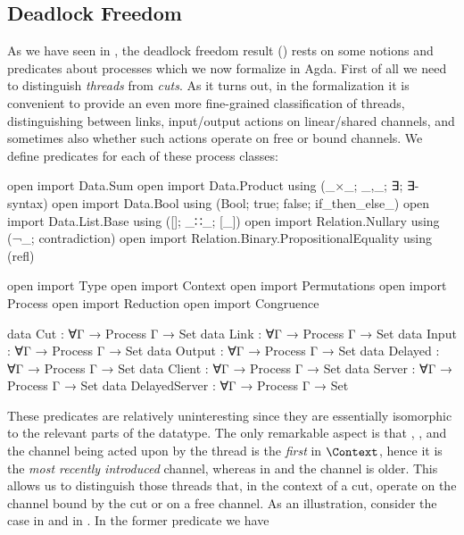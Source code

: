 \subsection{Deadlock Freedom}
\label{sec:deadlock-freedom-agda}

As we have seen in , the deadlock freedom result
() rests on some notions and predicates about processes which we
now formalize in Agda. First of all we need to distinguish \emph{threads} from
\emph{cuts}. As it turns out, in the formalization it is convenient to provide
an even more fine-grained classification of threads, distinguishing between
links, input/output actions on linear/shared channels, and sometimes also
whether such actions operate on free or bound channels. We define predicates for
each of these process classes:

\begin{code}[hide]
open import Data.Sum
open import Data.Product using (_×_; _,_; ∃; ∃-syntax)
open import Data.Bool using (Bool; true; false; if_then_else_)
open import Data.List.Base using ([]; _∷_; [_])
open import Relation.Nullary using (¬_; contradiction)
open import Relation.Binary.PropositionalEquality using (refl)

open import Type
open import Context
open import Permutations
open import Process
open import Reduction
open import Congruence
\end{code}

\begin{code}
data Cut            : ∀{Γ} → Process Γ → Set
data Link           : ∀{Γ} → Process Γ → Set
data Input          : ∀{Γ} → Process Γ → Set
data Output         : ∀{Γ} → Process Γ → Set
data Delayed        : ∀{Γ} → Process Γ → Set
data Client         : ∀{Γ} → Process Γ → Set
data Server         : ∀{Γ} → Process Γ → Set
data DelayedServer  : ∀{Γ} → Process Γ → Set
\end{code}

These predicates are relatively uninteresting since they are essentially
isomorphic to the relevant parts of the  datatype. The
only remarkable aspect is that , ,
 and  the channel being acted upon by
the thread is the \emph{first} in $\Context$, hence it is the \emph{most
recently introduced} channel, whereas in  and
 the channel is older. This allows us to distinguish
those threads that, in the context of a cut, operate on the channel bound by the
cut or on a free channel. As an illustration, consider the
 case in  and in
. In the former predicate we have

